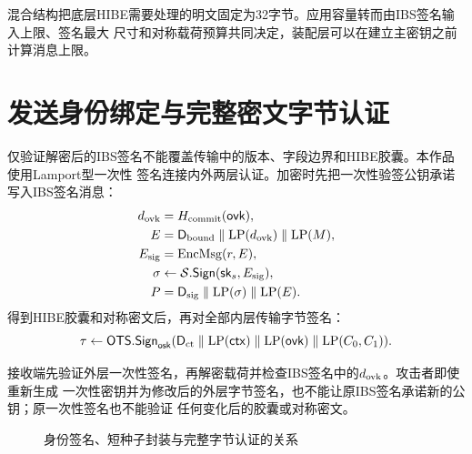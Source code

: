 混合结构把底层HIBE需要处理的明文固定为32字节。应用容量转而由IBS签名输入上限、签名最大
尺寸和对称载荷预算共同决定，装配层可以在建立主密钥之前计算消息上限。

\section{发送身份绑定与完整密文字节认证}

仅验证解密后的IBS签名不能覆盖传输中的版本、字段边界和HIBE胶囊。本作品使用Lamport型一次性
签名连接内外两层认证\cite{lamport1979ots}。加密时先把一次性验签公钥承诺写入IBS签名消息：
\begin{align*}
 d_{\rm ovk}&=H_{\rm commit}(\mathsf{ovk}),\\
 E&=\mathsf D_{\rm bound}\parallel\mathrm{LP}(d_{\rm ovk})
       \parallel\mathrm{LP}(M),\\
 E_{\rm sig}&=\operatorname{EncMsg}(r,E),\\
 \sigma&\leftarrow\mathcal S.\mathsf{Sign}
       (\mathsf{sk}_s,E_{\rm sig}),\\
 P&=\mathsf D_{\rm sig}\parallel\mathrm{LP}(\sigma)\parallel\mathrm{LP}(E).
\end{align*}
得到HIBE胶囊和对称密文后，再对全部内层传输字节签名：
\[
 \tau\leftarrow\mathsf{OTS.Sign}_{\mathsf{osk}}
    (\mathsf D_{\rm ct}\parallel\mathrm{LP}(\mathsf{ctx})
      \parallel\mathrm{LP}(\mathsf{ovk})\parallel\mathrm{LP}(C_0,C_1)).
\]

接收端先验证外层一次性签名，再解密载荷并检查IBS签名中的$d_{\rm ovk}$。攻击者即使重新生成
一次性密钥并为修改后的外层字节签名，也不能让原IBS签名承诺新的公钥；原一次性签名也不能验证
任何变化后的胶囊或对称密文。

\begin{figure}[H]
\centering
{}
\caption{身份签名、短种子封装与完整字节认证的关系}
\label{fig:protocol-generation}
\end{figure}


